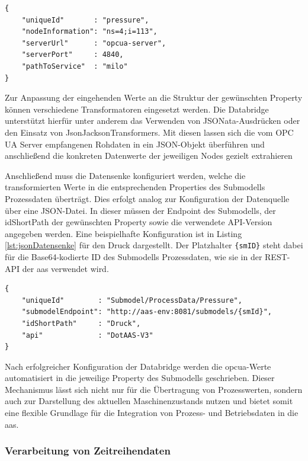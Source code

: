 \begin{lstlisting}[style=jsonstyle, caption={Beispielhafte JSON-Konfiguration einer Datenquelle}, label={lst:jsonDatenquelle}]
{
    "uniqueId"       : "pressure",
    "nodeInformation": "ns=4;i=113",
    "serverUrl"      : "opcua-server",
    "serverPort"     : 4840,
    "pathToService"  : "milo"
}
\end{lstlisting}

Zur Anpassung der eingehenden Werte an die Struktur der gewünschten Property können verschiedene Transformatoren eingesetzt werden. 
Die Databridge unterstützt hierfür unter anderem das Verwenden von JSONata-Ausdrücken oder den Einsatz von JsonJacksonTransformers. 
Mit diesen lassen sich die vom OPC UA Server empfangenen Rohdaten in ein JSON-Objekt überführen und anschließend die konkreten Datenwerte der jeweiligen Nodes gezielt extrahieren

Anschließend muss die Datensenke konfiguriert werden, welche die transformierten Werte in die entsprechenden Properties des Submodells Prozessdaten überträgt.
Dies erfolgt analog zur Konfiguration der Datenquelle über eine JSON-Datei.
In dieser müssen der Endpoint des Submodells, der idShortPath der gewünschten Property sowie die verwendete API-Version angegeben werden.
Eine beispielhafte Konfiguration ist in Listing \ref{lst:jsonDatensenke} für den Druck dargestellt.
Der Platzhalter \texttt{\{smID\}} steht dabei für die Base64-kodierte ID des Submodells Prozessdaten, wie sie in der REST-API der \acs{aas} verwendet wird.

\begin{lstlisting}[style=jsonstyle, caption={Beispielhafte JSON-Konfiguration einer Datensenke}, label={lst:jsonDatensenke}]
{
    "uniqueId"        : "Submodel/ProcessData/Pressure",
    "submodelEndpoint": "http://aas-env:8081/submodels/{smId}",
    "idShortPath"     : "Druck",
    "api"             : "DotAAS-V3"
}
\end{lstlisting}

Nach erfolgreicher Konfiguration der Databridge werden die \acs{opcua}-Werte automatisiert in die jeweilige Property des Submodells geschrieben. 
Dieser Mechanismus lässt sich nicht nur für die Übertragung von Prozesswerten, sondern auch zur Darstellung des aktuellen Maschinenzustands nutzen und bietet somit eine flexible Grundlage für die Integration von Prozess- und Betriebsdaten in die \acs{aas}.
\subsubsection{Verarbeitung von Zeitreihendaten}

